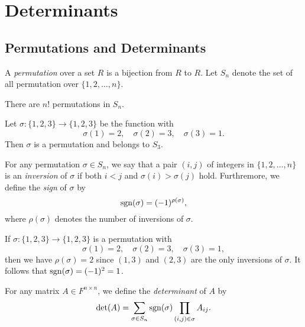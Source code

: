 \chapter{Determinants}
\section{Permutations and Determinants}
\begin{definition}
  A \emph{permutation} over a set $R$ is a bijection from $R$ to $R$.
  Let $S_n$ denote the set of all permutation over $\{1, 2, \dots, n\}$.
\end{definition}

\begin{remark}
  There are $n!$ permutations in $S_n$.
\end{remark}

\begin{example}
  Let $\sigma: \{1, 2, 3\} \to \{1, 2, 3\}$ be the function with
  \begin{equation*}
    \sigma(1) = 2,
    \quad
    \sigma(2) = 3,
    \quad
    \sigma(3) = 1.
  \end{equation*}
  Then $\sigma$ is a permutation and belongs to $S_3$.
\end{example}

\begin{definition}
  For any permutation $\sigma \in S_n$, we say that a pair $(i, j)$ of integers
  in $\{1, 2, \dots, n\}$ is an \emph{inversion} of $\sigma$ if both $i < j$
  and $\sigma(i) > \sigma(j)$ hold.
  Furthremore, we define the \emph{sign} of $\sigma$ by
  \begin{equation*}
    \operatorname{sgn}(\sigma) = (-1)^{\rho(\sigma)},
  \end{equation*}
  where $\rho(\sigma)$ denotes the number of inversions of $\sigma$.
\end{definition}

\begin{example}
  If $\sigma: \{1, 2, 3\} \to \{1, 2, 3\}$ is a permutation with
  \begin{equation*}
    \sigma(1) = 2,
    \quad
    \sigma(2) = 3,
    \quad
    \sigma(3) = 1,
  \end{equation*}
  then we have $\rho(\sigma) = 2$ since $(1, 3)$ and $(2, 3)$ are the only
  inversions of $\sigma$.
  It follows that $\operatorname{sgn}(\sigma) = (-1)^2 = 1$.
\end{example}

\begin{definition}
  For any matrix $A \in F^{n \times n}$, we define the \emph{determinant} of
  $A$ by
  \begin{equation*}
    \det(A) = \sum_{\sigma \in S_n} \operatorname{sgn}(\sigma) \prod_{(i, j) \in \sigma}
    A_{ij}.
  \end{equation*}
\end{definition}

